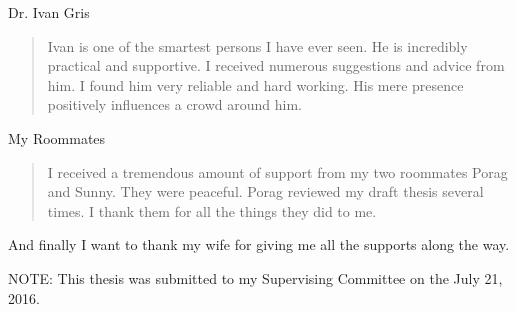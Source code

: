 \noindent
Dr. Ivan Gris
\begin{quote}
  Ivan is one of the smartest persons I have ever seen. He is incredibly practical and supportive. I received numerous suggestions and advice from him. I found him very reliable and hard working. His mere presence positively influences a crowd around him. 
\end{quote}

\noindent
My Roommates
\begin{quote}
  I received a tremendous amount of support from my two roommates Porag and Sunny. They were peaceful. Porag reviewed my draft thesis several times. I thank them for all the things they did to me.
\end{quote}


And finally I want to thank my wife for giving me all the supports along the way. 

\vfill
\noindent
NOTE: This thesis was submitted to my Supervising Committee on the July 21, 2016.
